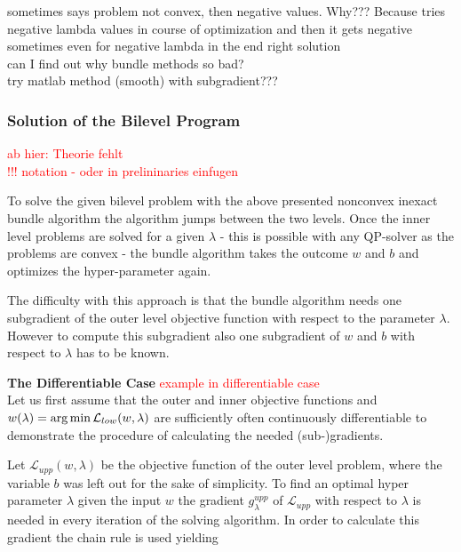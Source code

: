 sometimes says problem not convex, then negative values. Why??? Because tries negative lambda values in course of optimization and then it gets negative \\
sometimes even for negative lambda in the end right solution \\
can I find out why bundle methods so bad? \\
try matlab method (smooth) with subgradient???




\subsubsection{Solution of the Bilevel Program}

\textcolor{red}{ab hier: Theorie fehlt\\
!!! notation - oder in prelininaries einfugen}

To solve the given bilevel problem with the above presented nonconvex inexact bundle algorithm the algorithm jumps between the two levels. Once the inner level problems are solved for a given \(\lambda\) - this is possible with any QP-solver as the problems are convex - the bundle algorithm takes the outcome \(w\) and \(b\) and optimizes the hyper-parameter again.

The difficulty with this approach is that the bundle algorithm needs one subgradient of the outer level objective function with respect to the parameter \(\lambda\). However to compute this subgradient also one subgradient of \(w\) and \(b\) with respect to \(\lambda\) has to be known.

\textbf{The Differentiable Case}
\textcolor{red}{example in differentiable case}\\
Let us first assume that the outer and inner objective functions and \(w(\lambda)= \operatorname*{arg\,min} \mathcal{L}_{low}(w,\lambda)\) are sufficiently often continuously differentiable to demonstrate the procedure of calculating the needed {(sub-)gradients}.

Let \(\mathcal{L}_{upp}(w,\lambda)\) be the objective function of the outer level problem, where the variable \(b\) was left out for the sake of simplicity.
To find an optimal hyper parameter \(\lambda\) given the input \(w\) the gradient \(g^{upp}_{\lambda}\) of \(\mathcal{L}_{upp}\) with respect to \(\lambda\) is needed in every iteration of the solving algorithm.
In order to calculate this gradient the chain rule is used yielding

